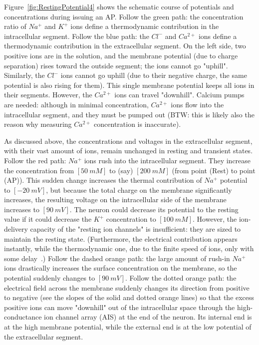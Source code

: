 Figure~\ref{fig:RestingPotential4} shows the schematic course of potentials and concentrations during issuing an \gls{AP}. 
Follow the green path: the concentration ratio of 
$Na^+$ and $K^+$ ions define a thermodynamic contribution in the intracellular segment. Follow the 
blue path: the $Cl^-$ and $Ca^{2+}$ ions define a thermodynamic contribution in the extracellular segment.
%
On the left side, two positive ions are in the solution, and the membrane potential (due to charge separation) rises toward the outside segment; the ions cannot go "uphill". Similarly, 
the $Cl^-$ ions cannot go uphill (due to their negative charge, the same potential is also rising for them). This single membrane potential keeps all ions in their segments. However, the $Ca^{2+}$ ions can travel "downhill".
Calcium pumps are needed: although in minimal concentration, $Ca^{2+}$ ions flow into 
the intracellular segment, and they must be pumped out (BTW: this is likely also the reason why measuring $Ca^{2+}$ concentration is inaccurate).
\else

\fi



\ifx\magyar\undefined
As discussed above, 
the concentrations and voltages in the extracellular segment, with their vast amount of ions, remain unchanged
in resting and transient states.
Follow the red path: $Na^+$ ions rush into the intracellular segment.
They increase the concentration from $[50\ mM]$ to (say) $[200\ mM]$
(from point (Rest) to point (AP)). This sudden change increases the thermal contribution of $Na^+$ potential to $[-20\ mV]$, but 
because the total charge on the membrane significantly increases, the resulting voltage on the intracellular side of the membrane increases to $[90\ mV]$.
The neuron could decrease its potential to the resting value if it could decrease the $K^+$ concentration to $[100\ mM]$. However, the ion-delivery capacity of the "resting ion channels" is insufficient: they are sized to maintain the resting state.
(Furthermore, the electrical contribution appears instantly, while the thermodynamic one, due to the finite speed of ions, only with some delay~\cite{VeghNonOrdinaryLawsForLife:2025}.)
Follow the dashed orange path: the large amount of rush-in $Na^+$ ions drastically increases the surface concentration on the membrane, so the potential suddenly changes to $[90\ mV]$. Follow the dotted orange path: the electrical field across the membrane suddenly changes its direction from positive to negative (see the slopes of the solid and dotted orange lines) so that the excess positive ions can move "downhill" out of the intracellular space through the high-conductance ion channel array (\gls{AIS}) at the end of the neuron.
Its internal end is at the high membrane potential,
while the external end is at the low potential of the extracellular segment. 


